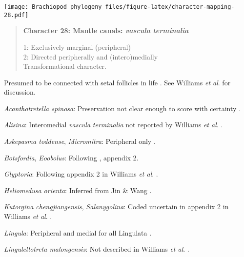 \documentclass[openany]{book}
\theoremstyle{definition}
\theoremstyle{definition}
\theoremstyle{definition}
\theoremstyle{remark}
\begin{document}
\texttt{[image: Brachiopod\_phylogeny\_files/figure-latex/character-mapping-28.pdf]}

\begin{quote}
\textbf{Character 28: Mantle canals: \emph{vascula} \emph{terminalia}}

1: Exclusively marginal (peripheral)\\
2: Directed peripherally and (intero)medially\\
Transformational character.
\end{quote}

Presumed to be connected with setal follicles in life
\citep{Williams1998Thediversity}. See Williams \emph{et al}.
\citeyearpar{Williams2000LinguliformeaCraniiformea} for discussion.

\hypertarget{Acanthotretella_spinosa-coding-28}{}
\emph{Acanthotretella spinosa}: Preservation not clear enough to score
with certainty \citep{Holmer2006Aspinose}.

\hypertarget{Alisina-coding-28}{}
\emph{Alisina}: Interomedial \emph{vascula} \emph{terminalia} not
reported by Williams \emph{et al}.
\citeyearpar{Williams2000LinguliformeaCraniiformea}.

\hypertarget{Askepasma_toddense-coding-28}{}
\emph{Askepasma toddense}, \emph{Micromitra}: Peripheral only
\citep{Williams1998Thediversity, Williams2000LinguliformeaCraniiformea}.

\hypertarget{Botsfordia-coding-28}{}
\emph{Botsfordia}, \emph{Eoobolus}: Following
\citet{Williams1998Thediversity}, appendix 2.

\hypertarget{Glyptoria-coding-28}{}
\emph{Glyptoria}: Following appendix 2 in Williams \emph{et al}.
\citeyearpar{Williams1998Thediversity}.

\hypertarget{Heliomedusa_orienta-coding-28}{}
\emph{Heliomedusa orienta}: Inferred from Jin \& Wang
\citeyearpar{Jin1992Revisionof}.

\hypertarget{Kutorgina_chengjiangensis-coding-28}{}
\emph{Kutorgina chengjiangensis}, \emph{Salanygolina}: Coded uncertain
in appendix 2 in Williams \emph{et al}.
\citeyearpar{Williams1998Thediversity}.

\hypertarget{Lingula-coding-28}{}
\emph{Lingula}: Peripheral and medial for all Lingulata
\citep{Williams2000LinguliformeaCraniiformea}.

\hypertarget{Lingulellotreta_malongensis-coding-28}{}
\emph{Lingulellotreta malongensis}: Not described in Williams \emph{et
al}. \citeyearpar{Williams2000LinguliformeaCraniiformea}.
\end{document}
